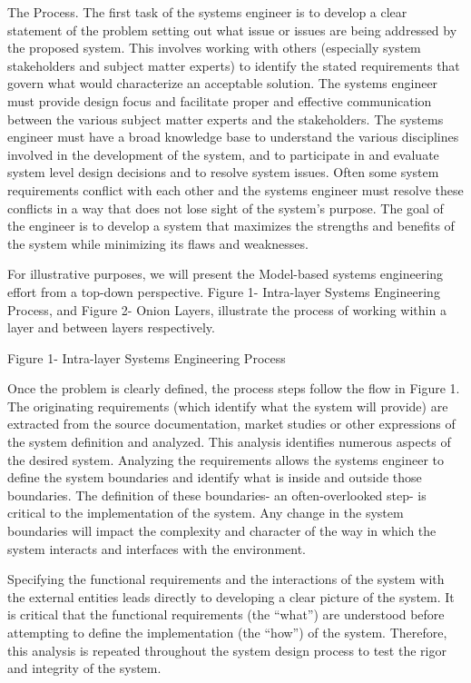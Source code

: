 The Process. The first task of the systems engineer is to develop a clear statement of the problem setting out what issue or issues are being addressed by the proposed system. This involves working with others (especially system stakeholders and subject matter experts) to identify the stated requirements that govern what would characterize an acceptable solution. The systems engineer must provide design focus and facilitate proper and effective communication between the various subject matter experts and the stakeholders. The systems engineer must have a broad knowledge base to understand the various disciplines involved in the development of the system, and to participate in and evaluate system level design decisions and to resolve system issues. Often some system requirements conflict with each other and the systems engineer must resolve these conflicts in a way that does not lose sight of the system’s purpose. The goal of the engineer is to develop a system that maximizes the strengths and benefits of the system while minimizing its flaws and weaknesses. 

For illustrative purposes, we will present the Model-based systems engineering effort from a top-down perspective. Figure 1- Intra-layer Systems Engineering Process, and Figure 2- Onion Layers, illustrate the process of working within a layer and between layers respectively.
 
Figure 1- Intra-layer Systems Engineering Process

Once the problem is clearly defined, the process steps follow the flow in Figure 1. The originating requirements (which identify what the system will provide) are extracted from the source documentation, market studies or other expressions of the system definition and analyzed. This analysis identifies numerous aspects of the desired system. Analyzing the requirements allows the systems engineer to define the system boundaries and identify what is inside and outside those boundaries. The definition of these boundaries- an often-overlooked step- is critical to the implementation of the system. Any change in the system boundaries will impact the complexity and character of the way in which the system interacts and interfaces with the environment.

Specifying the functional requirements and the interactions of the system with the external entities leads directly to developing a clear picture of the system. It is critical that the functional requirements (the “what”) are understood before attempting to define the implementation (the “how”) of the system. Therefore, this analysis is repeated throughout the system design process to test the rigor and integrity of the system.

